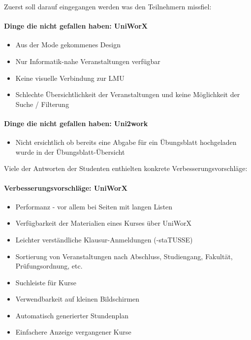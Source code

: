 \documentclass[11pt,a4paper,twoside,ngerman]{article}
\begin{document}
Zuerst soll darauf eingegangen werden was den Teilnehmern missfiel:

\paragraph{Dinge die nicht gefallen haben: \textbf{UniWorX}}
\begin{itemize}
    \item Aus der Mode gekommenes Design
    \item Nur Informatik-nahe Veranstaltungen verfügbar
    \item Keine visuelle Verbindung zur LMU
    \item Schlechte Übersichtlichkeit der Veranstaltungen und keine Möglichkeit der Suche / Filterung
\end{itemize}

\paragraph{Dinge die nicht gefallen haben: \textbf{Uni2work}}
\begin{itemize}
    \item Nicht ersichtlich ob bereits eine Abgabe für ein Übungsblatt hochgeladen wurde in der Übungsblatt-Übersicht
\end{itemize}

Viele der Antworten der Studenten enthielten konkrete Verbesserungsvorschläge:

\paragraph{Verbesserungsvorschläge: \textbf{UniWorX}}
\begin{itemize}
    \item Performanz - vor allem bei Seiten mit langen Listen
    \item Verfügbarkeit der Materialien eines Kurses über UniWorX
    \item Leichter verständliche Klausur-Anmeldungen (-staTUSSE)
    \item Sortierung von Veranstaltungen nach Abschluss, Studiengang, Fakultät, Prüfungsordnung, etc.
    \item Suchleiste für Kurse
    \item Verwendbarkeit auf kleinen Bildschirmen
    \item Automatisch generierter Stundenplan
    \item Einfachere Anzeige vergangener Kurse
\end{itemize}
\end{document}
